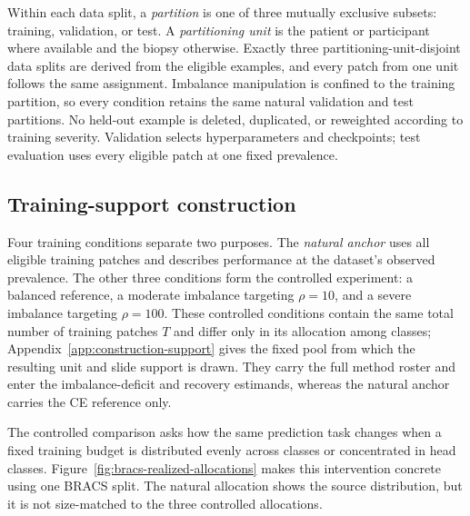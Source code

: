 \documentclass[11pt]{article}
\begin{document}
Within each data split, a \emph{partition} is one of three mutually exclusive subsets: training, validation, or test. A \emph{partitioning unit} is the patient or participant where available and the biopsy otherwise. Exactly three partitioning-unit-disjoint data splits are derived from the eligible examples, and every patch from one unit follows the same assignment. Imbalance manipulation is confined to the training partition, so every condition retains the same natural validation and test partitions. No held-out example is deleted, duplicated, or reweighted according to training severity. Validation selects hyperparameters and checkpoints; test evaluation uses every eligible patch at one fixed prevalence.

\subsection{Training-support construction}
Four training conditions separate two purposes. The \emph{natural anchor} uses all eligible training patches and describes performance at the dataset's observed prevalence. The other three conditions form the controlled experiment: a balanced reference, a moderate imbalance targeting $\rho=10$, and a severe imbalance targeting $\rho=100$. These controlled conditions contain the same total number of training patches $T$ and differ only in its allocation among classes; Appendix~\ref{app:construction-support} gives the fixed pool from which the resulting unit and slide support is drawn. They carry the full method roster and enter the imbalance-deficit and recovery estimands, whereas the natural anchor carries the CE reference only.

The controlled comparison asks how the same prediction task changes when a fixed training budget is distributed evenly across classes or concentrated in head classes. Figure~\ref{fig:bracs-realized-allocations} makes this intervention concrete using one BRACS split. The natural allocation shows the source distribution, but it is not size-matched to the three controlled allocations.
\end{document}
